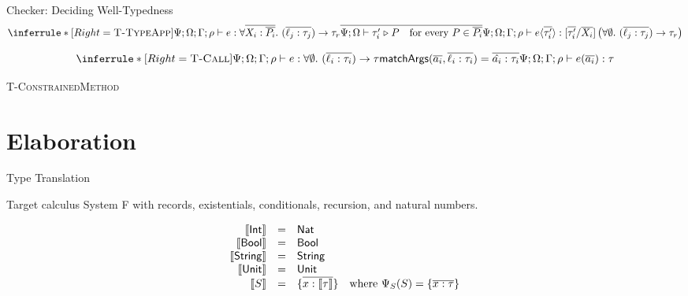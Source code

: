 \begin{frame}{Checker: Deciding Well-Typedness}
\scriptsize
\[
\inferrule*[Right=\textsc{T-TypeApp}]
  {
    \Psi;\Omega;\Gamma;\rho \vdash e:
      \ftype{\overline{X_i:\overline{P_i}}}
             {\overline{\ell_j:\tau_j}}
             {\tau_r}
    \\
    \overline{
      \Psi;\Omega \vdash \tau_i' \modelsP P
      \quad\text{for every }P\in\overline{P_i}}
  }
  {
    \Psi;\Omega;\Gamma;\rho \vdash
      e\langle\overline{\tau_i'}\rangle:
      \subst{\overline{\tau_i'}}{\overline{X_i}}
      \left(\ftype{\emptyctx}{\overline{\ell_j:\tau_j}}{\tau_r}\right)
  }
\]

\vspace{-1mm}
\[
\inferrule*[Right=\textsc{T-Call}]
  {
    \Psi;\Omega;\Gamma;\rho \vdash e :
      \ftype{\emptyctx}{\overline{\ell_i:\tau_i}}{\tau}
    \\
    \kw{matchArgs}(\overline{a_i},\overline{\ell_i:\tau_i})
      = \overline{\hat{a_i}:\tau_i}
  }
  {
    \Psi;\Omega;\Gamma;\rho \vdash e(\overline{a_i}) : \tau
  }
\]

\vspace{-2mm}
\begin{center}
\textsc{T-ConstrainedMethod}

\end{center}
\end{frame}

\section{Elaboration}


\begin{frame}{Type Translation}
\small
\begin{block}{Target calculus}
System F with records, existentials, conditionals, recursion, and natural
numbers.
\end{block}
\small
\[
\begin{array}{rcl}
\llbracket \mathsf{Int} \rrbracket &=& \mathsf{Nat} \\
\llbracket \mathsf{Bool} \rrbracket &=& \mathsf{Bool} \\
\llbracket \mathsf{String} \rrbracket &=& \mathsf{String} \\
\llbracket \mathsf{Unit} \rrbracket &=& \mathsf{Unit} \\
\llbracket S \rrbracket &=& \{\overline{x:\llbracket \tau \rrbracket}\}
  \quad \text{where }\Psi_S(S)=\{\overline{x:\tau}\}
\end{array}
\]

\end{frame}

